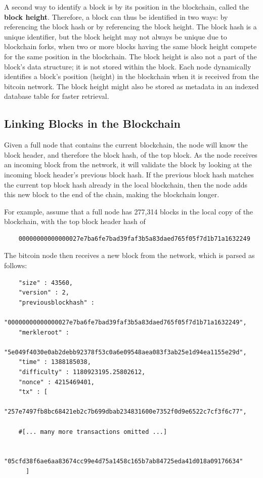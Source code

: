 \documentclass{article}
\begin{document}
    A second way to identify a block is by its position in the blockchain, called the \textbf{block height}. Therefore, a block can thus be identified in two ways: by referencing the block hash or by referencing the block height. The block hash is a unique identifier, but the block height may not always be unique due to blockchain forks, when two or more blocks having the same block height compete for the same position in the blockchain. The block height is also not a part of the block's data structure; it is not stored within the block. Each node dynamically identifies a block's position (height) in the blockchain when it is received from the bitcoin network. The block height might also be stored as metadata in an indexed database table for faster retrieval.

  \subsection{Linking Blocks in the Blockchain}

    Given a full node that contains the current blockchain, the node will know the block header, and therefore the block hash, of the top block. As the node receives an incoming block from the network, it will validate the block by looking at the incoming block header's previous block hash. If the previous block hash matches the current top block hash already in the local blockchain, then the node adds this new block to the end of the chain, making the blockchain longer.

    For example, assume that a full node has 277,314 blocks in the local copy of the blockchain, with the top block header hash of

    \begin{lstlisting}
    00000000000000027e7ba6fe7bad39faf3b5a83daed765f05f7d1b71a1632249
    \end{lstlisting}

    The bitcoin node then receives a new block from the network, which is parsed as follows:

    \begin{lstlisting}
    "size" : 43560,
    "version" : 2,
    "previousblockhash" :
        "00000000000000027e7ba6fe7bad39faf3b5a83daed765f05f7d1b71a1632249",
    "merkleroot" :
        "5e049f4030e0ab2debb92378f53c0a6e09548aea083f3ab25e1d94ea1155e29d",
    "time" : 1388185038,
    "difficulty" : 1180923195.25802612,
    "nonce" : 4215469401,
    "tx" : [
        "257e7497fb8bc68421eb2c7b699dbab234831600e7352f0d9e6522c7cf3f6c77",

    #[... many more transactions omitted ...]

        "05cfd38f6ae6aa83674cc99e4d75a1458c165b7ab84725eda41d018a09176634"
      ]
    \end{lstlisting}
\end{document}
